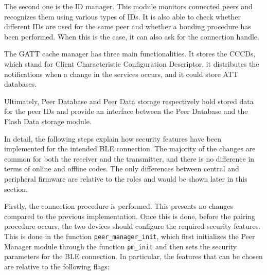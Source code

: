 \documentclass{Configuration_Files/PoliMi3i_thesis}
\begin{document}
The second one is the ID manager. This module monitors connected peers and recognizes them using various types of IDs. It is also able to check whether different IDs are used for the same peer and whether a bonding procedure has been performed. When this is the case, it can also ask for the connection handle.

The GATT cache manager has three main functionalities. It stores the CCCDs, which stand for Client Characteristic Configuration Descriptor, it distributes the notifications when a change in the services occurs, and it could store ATT databases.

Ultimately, Peer Database and Peer Data storage respectively hold stored data for the peer IDs and provide an interface between the Peer Database and the Flash Data storage module.

In detail, the following steps explain how security features have been implemented for the intended BLE connection. The majority of the changes are common for both the receiver and the transmitter, and there is no difference in terms of online and offline codes. The only differences between central and peripheral firmware are relative to the roles and would be shown later in this section.

Firstly, the connection procedure is performed. This presents no changes compared to the previous implementation. Once this is done, before the pairing procedure occurs, the two devices should configure the required security features. This is done in the function \texttt{peer\_manager\_init}, which first initializes the Peer Manager module through the function \texttt{pm\_init} and then sets the security parameters for the BLE connection. In particular, the features that can be chosen are relative to the following flags:
\end{document}
